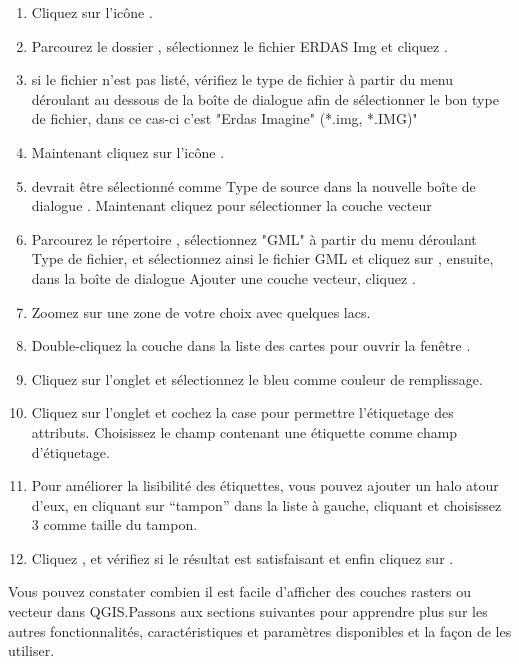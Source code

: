\begin{enumerate}
\item Cliquez sur l'icône .
\item Parcourez le dossier , sélectionnez 
le fichier ERDAS Img  et cliquez .
\item si le fichier n'est pas listé, vérifiez le type de fichier à partir du menu déroulant 
au dessous de la boîte de dialogue afin de sélectionner le bon type de fichier, dans ce cas-ci c'est 
"Erdas Imagine" (*.img, *.IMG)"
\item Maintenant cliquez sur l'icône . 
\item {} devrait être sélectionné comme Type de source dans la nouvelle boîte de dialogue 
. Maintenant cliquez  pour sélectionner la couche vecteur
\item Parcourez le répertoire , sélectionnez "GML"
à partir du menu déroulant Type de fichier, et sélectionnez ainsi le fichier GML  
et cliquez sur , ensuite, dans la boîte de dialogue Ajouter une couche vecteur, cliquez .
\item Zoomez sur une zone de votre choix avec quelques lacs.
\item Double-cliquez la couche  dans la liste des cartes pour ouvrir la fenêtre .
\item Cliquez sur l'onglet  et sélectionnez le bleu comme couleur de remplissage.
\item Cliquez sur l'onglet  et cochez la case  pour permettre l'étiquetage des attributs. 
Choisissez le champ contenant une étiquette comme champ d'étiquetage.
\item Pour améliorer la lisibilité des étiquettes, vous pouvez ajouter un halo atour d'eux,
en cliquant sur ``tampon'' dans la liste à gauche, cliquant  et choisissez 3 comme taille du tampon.
\item Cliquez , et vérifiez si le résultat est satisfaisant et enfin cliquez sur .
\end{enumerate} 

Vous pouvez constater combien il est facile d'afficher des couches rasters ou vecteur dans QGIS.Passons aux sections suivantes pour apprendre plus sur les autres fonctionnalités, caractéristiques et paramètres disponibles et la façon de les utiliser.
